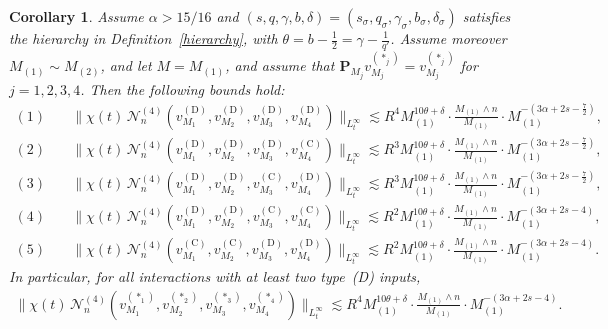 \documentclass[11pt,reqno,english]{amsart}
\numberwithin{equation}{section}
\theoremstyle{plain}
\newtheorem{corollary}[theorem]{Corollary}
\theoremstyle{definition}
\theoremstyle{remark}
\begin{document}
\begin{corollary}\label{cor:4-linear-1}
	Assume $\alpha>15/16$ and $(s,q,\gamma,b,\delta)=(s_{\sigma},q_{\sigma},\gamma_{\sigma},b_{\sigma},\delta_{\sigma})$ satisfies the hierarchy in Definition~\ref{hierarchy}, with $\theta=b-\frac{1}{2}=\gamma-\frac{1}{q'}$. Assume moreover $M_{(1)}\sim M_{(2)}$, and let $M=M_{(1)}$, and assume that $\mathbf{P}_{M_j}v_{M_j}^{(\ast_j)}=v_{M_j}^{(\ast_j)}$ for $j=1,2,3,4$.
	Then the following bounds hold:
	\begin{align*}
		\mathrm{(1)} \quad &
		\|\chi(t)\,\mathcal{N}_n^{(4)}(v^{(\mathrm{D})}_{M_1},v^{(\mathrm{D})}_{M_2},v^{(\mathrm{D})}_{M_3},v^{(\mathrm{D})}_{M_4})\|_{L_t^{\infty}}
		\lesssim
		R^4 M_{(1)}^{10\theta+\delta}\cdot
		\frac{M_{(1)}\wedge n}{M_{(1)}}\cdot M_{(1)}^{-(3\alpha+2s-\frac{7}{2})},\\
		\mathrm{(2)} \quad &
		\|\chi(t)\,\mathcal{N}_n^{(4)}(v^{(\mathrm{D})}_{M_1},v^{(\mathrm{D})}_{M_2},v^{(\mathrm{D})}_{M_3},v^{(\mathrm{C})}_{M_4})\|_{L_t^{\infty}}
		\lesssim
		R^3 M_{(1)}^{10\theta+\delta}\cdot
		\frac{M_{(1)}\wedge n}{M_{(1)}}\cdot M_{(1)}^{-(3\alpha+2s-\frac72)},\\
		\mathrm{(3)} \quad &
		\|\chi(t)\,\mathcal{N}_n^{(4)}(v^{(\mathrm{D})}_{M_1},v^{(\mathrm{D})}_{M_2},v^{(\mathrm{C})}_{M_3},v^{(\mathrm{D})}_{M_4})\|_{L_t^{\infty}}
		\lesssim
		R^3 M_{(1)}^{10\theta+\delta}\cdot
		\frac{M_{(1)}\wedge n}{M_{(1)}}\cdot M_{(1)}^{-(3\alpha+2s-\frac72)},\\
		\mathrm{(4)} \quad &
		\|\chi(t)\,\mathcal{N}_n^{(4)}(v^{(\mathrm{D})}_{M_1},v^{(\mathrm{D})}_{M_2},v^{(\mathrm{C})}_{M_3},v^{(\mathrm{C})}_{M_4})\|_{L_t^{\infty}}
		\lesssim
		R^2 M_{(1)}^{10\theta+\delta}\cdot
		\frac{M_{(1)}\wedge n}{M_{(1)}}\cdot M_{(1)}^{-(3\alpha+2s-4)},\\
		\mathrm{(5)} \quad &
		\|\chi(t)\,\mathcal{N}_n^{(4)}(v^{(\mathrm{C})}_{M_1},v^{(\mathrm{C})}_{M_2},v^{(\mathrm{D})}_{M_3},v^{(\mathrm{D})}_{M_4})\|_{L_t^{\infty}}
		\lesssim
		R^2 M_{(1)}^{10\theta+\delta}\cdot
		\frac{M_{(1)}\wedge n}{M_{(1)}}\cdot M_{(1)}^{-(3\alpha+2s-4)}.
	\end{align*}
	In particular, for all interactions with at least two type~(D) inputs,
	\begin{align}\label{cor:4-linear-1-uniform}
		\|\chi(t)\,\mathcal{N}_n^{(4)}(v^{(\ast_1)}_{M_1},v^{(\ast_2)}_{M_2},v^{(\ast_3)}_{M_3},v^{(\ast_4)}_{M_4})\|_{L_t^{\infty}}
		\lesssim
		R^4 M_{(1)}^{10\theta+\delta}\cdot
		\frac{M_{(1)}\wedge n}{M_{(1)}}\cdot M_{(1)}^{-(3\alpha+2s-4)}.
	\end{align}
\end{corollary}
\end{document}
